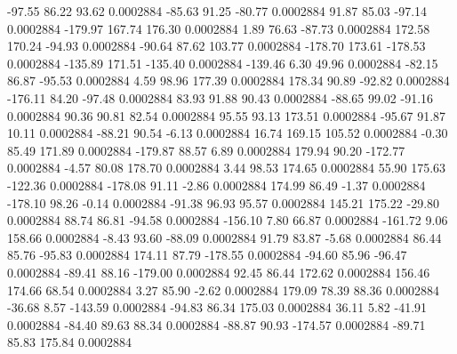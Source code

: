       -97.55       86.22       93.62     0.0002884
      -85.63       91.25      -80.77     0.0002884
       91.87       85.03      -97.14     0.0002884
     -179.97      167.74      176.30     0.0002884
        1.89       76.63      -87.73     0.0002884
      172.58      170.24      -94.93     0.0002884
      -90.64       87.62      103.77     0.0002884
     -178.70      173.61     -178.53     0.0002884
     -135.89      171.51     -135.40     0.0002884
     -139.46        6.30       49.96     0.0002884
      -82.15       86.87      -95.53     0.0002884
        4.59       98.96      177.39     0.0002884
      178.34       90.89      -92.82     0.0002884
     -176.11       84.20      -97.48     0.0002884
       83.93       91.88       90.43     0.0002884
      -88.65       99.02      -91.16     0.0002884
       90.36       90.81       82.54     0.0002884
       95.55       93.13      173.51     0.0002884
      -95.67       91.87       10.11     0.0002884
      -88.21       90.54       -6.13     0.0002884
       16.74      169.15      105.52     0.0002884
       -0.30       85.49      171.89     0.0002884
     -179.87       88.57        6.89     0.0002884
      179.94       90.20     -172.77     0.0002884
       -4.57       80.08      178.70     0.0002884
        3.44       98.53      174.65     0.0002884
       55.90      175.63     -122.36     0.0002884
     -178.08       91.11       -2.86     0.0002884
      174.99       86.49       -1.37     0.0002884
     -178.10       98.26       -0.14     0.0002884
      -91.38       96.93       95.57     0.0002884
      145.21      175.22      -29.80     0.0002884
       88.74       86.81      -94.58     0.0002884
     -156.10        7.80       66.87     0.0002884
     -161.72        9.06      158.66     0.0002884
       -8.43       93.60      -88.09     0.0002884
       91.79       83.87       -5.68     0.0002884
       86.44       85.76      -95.83     0.0002884
      174.11       87.79     -178.55     0.0002884
      -94.60       85.96      -96.47     0.0002884
      -89.41       88.16     -179.00     0.0002884
       92.45       86.44      172.62     0.0002884
      156.46      174.66       68.54     0.0002884
        3.27       85.90       -2.62     0.0002884
      179.09       78.39       88.36     0.0002884
      -36.68        8.57     -143.59     0.0002884
      -94.83       86.34      175.03     0.0002884
       36.11        5.82      -41.91     0.0002884
      -84.40       89.63       88.34     0.0002884
      -88.87       90.93     -174.57     0.0002884
      -89.71       85.83      175.84     0.0002884
